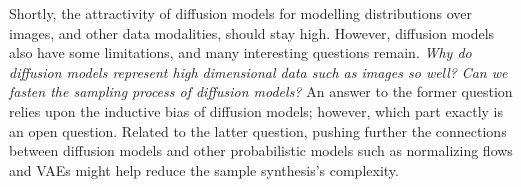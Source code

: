 Shortly, the attractivity of diffusion models for modelling distributions over images, and other data modalities, should stay high. However, diffusion models also have some limitations, and many interesting questions remain. \textit{Why do diffusion models represent high dimensional data such as images so well?} \textit{Can we fasten the sampling process of diffusion models?}
 An answer to the former question relies upon the inductive bias of diffusion models; however, which part exactly is an open question. Related to the latter question, pushing further the connections between diffusion models and other probabilistic models such as normalizing flows and VAEs might help reduce the sample synthesis's complexity.
%
